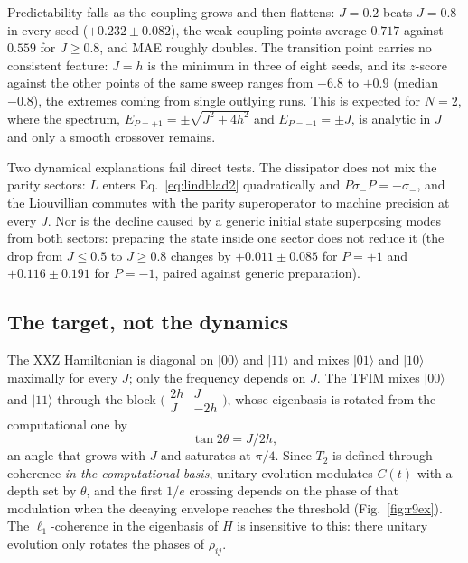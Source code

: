 \documentclass[twocolumn,10pt]{article}
\begin{document}
Predictability falls as the coupling grows and then flattens:
$J = 0.2$ beats $J = 0.8$ in every seed ($+0.232 \pm 0.082$), the
weak-coupling points average $0.717$ against $0.559$ for $J \ge 0.8$,
and MAE roughly doubles.
The transition point carries no consistent feature: $J = h$ is the
minimum in three of eight seeds, and its $z$-score against the other
points of the same sweep ranges from $-6.8$ to $+0.9$ (median $-0.8$),
the extremes coming from single outlying runs.
This is expected for $N = 2$, where the spectrum,
$E_{P=+1} = \pm\sqrt{J^2+4h^2}$ and $E_{P=-1} = \pm J$, is analytic in
$J$ and only a smooth crossover remains.

Two dynamical explanations fail direct tests.
The dissipator does not mix the parity sectors: $L$ enters
Eq.~\ref{eq:lindblad2} quadratically and $P\sigma_-P = -\sigma_-$, and
the Liouvillian commutes with the parity superoperator to machine
precision at every $J$.
Nor is the decline caused by a generic initial state superposing modes
from both sectors: preparing the state inside one sector does not reduce
it (the drop from $J \le 0.5$ to $J \ge 0.8$ changes by
$+0.011 \pm 0.085$ for $P = +1$ and $+0.116 \pm 0.191$ for $P = -1$,
paired against generic preparation).

\subsection{The target, not the dynamics}
\label{sec:r9}

The XXZ Hamiltonian is diagonal on $|00\rangle$ and $|11\rangle$ and
mixes $|01\rangle$ and $|10\rangle$ maximally for every $J$; only the
frequency depends on $J$.
The TFIM mixes $|00\rangle$ and $|11\rangle$ through the block
$\bigl(\begin{smallmatrix}2h & J\\ J & -2h\end{smallmatrix}\bigr)$, whose
eigenbasis is rotated from the computational one by
\begin{equation}
  \tan 2\theta = J/2h ,
  \label{eq:theta}
\end{equation}
an angle that grows with $J$ and saturates at $\pi/4$.
Since $T_2$ is defined through coherence \emph{in the computational
basis}, unitary evolution modulates $C(t)$ with a depth set by $\theta$,
and the first $1/e$ crossing depends on the phase of that modulation when
the decaying envelope reaches the threshold
(Fig.~\ref{fig:r9ex}).
The $\ell_1$-coherence in the eigenbasis of $H$ is insensitive to this:
there unitary evolution only rotates the phases of $\rho_{ij}$.
\end{document}
